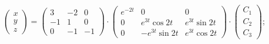 \begin{enumsolsfull}
		\item \( \begin{pmatrix} x \\ y \\ z \end{pmatrix} = \begin{pmatrix} 3 & -2 & 0 \\ -1 & 1 & 0 \\ 0 & -1 & -1 \end{pmatrix} \cdot \begin{pmatrix} e^{-2t} & 0 & 0 \\ 0 & e^{3t} \cos{2t} & e^{3t} \sin{2t} \\ 0 & -e^{3t} \sin{2t} & e^{3t} \cos{2t} \end{pmatrix} \cdot \begin{pmatrix} C_1 \\ C_2 \\ C_3 \end{pmatrix} \); %
		

\end{enumsolsfull}
